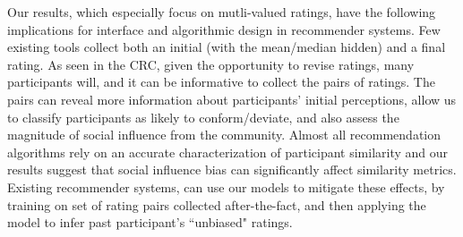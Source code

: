Our results, which especially focus on mutli-valued ratings, have the following implications for interface and algorithmic design in recommender systems.
Few existing tools collect both an initial (with the mean/median hidden) and a final rating.
As seen in the CRC, given the opportunity to revise ratings, many participants will, and it can be informative to collect the pairs of ratings.
The pairs can reveal more information about participants' initial perceptions, allow us to classify participants as likely to conform/deviate, and also assess the magnitude of social influence from the community.
Almost all recommendation algorithms rely on an accurate characterization of participant similarity and our results suggest that social influence bias can significantly affect similarity metrics.
Existing recommender systems, can use our models to mitigate these effects, by training on set of rating pairs collected after-the-fact, and then applying the model to infer past participant's ``unbiased" ratings.

